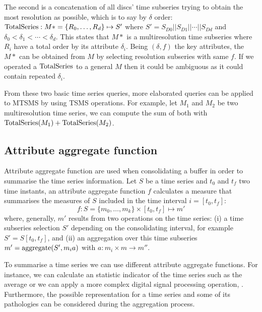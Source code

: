 The second is a concatenation of all discs' time subseries trying to
obtain the most resolution as possible, which is to say by $\delta$
order: $\operatorname{TotalSeries}: M*=\{R_0, \dots, R_d\} \mapsto S'$ where $S' =
S_{D0} || S_{D1} || \cdots || S_{Dd}$ and $\delta_0 < \delta_1 <
\cdots < \delta_d$. This states that $M*$ is a multiresolution time
subseries where $R_i$ have a total order by its attribute
$\delta_i$. Being $(\delta,f)$ the key attributes, the $M*$ can
be obtained from $M$ by selecting resolution subseries with same $f$. If we
operated a $\operatorname{TotalSeries}$ to a general $M$ then it could be ambiguous
as it could contain repeated $\delta_i$.


From these two basic time series queries, more elaborated queries can
be applied to MTSMS by using TSMS operations. For example, let $M_1$
and $M_2$ be two multiresolution time series, we can compute the sum
of both with $\operatorname{TotalSeries}(M_1) + \operatorname{TotalSeries}(M_2)$. 





\subsection{Attribute aggregate function}
\label{sec:model:interpolador}

Attribute aggregate function are used when consolidating a buffer in
order to summarise the time series information. Let $S$ be a time
series and $t_0$ and $t_f$ two time instants, an attribute aggregate
function $f$ calculates a measure that summarises the measures of $S$
included in the time interval $i=[t_0,t_f]$:
\[
f : S=\{m_0,\ldots,m_k\} \times [t_0,t_f] \mapsto m'
\]
where, generally, $m'$ results from two operations on the time series:
(i) a time subseries selection $S'$ depending on the consolidating
interval, for example $S' = S[t_0,t_f]$, and (ii) an aggregation over
this time subseries $m' = \operatorname*{aggregate}(S',m_i a)$ with $a: m_i \times
m\rightarrow m''$.  

To summarise a time series we can use different attribute aggregate
functions.  For instance, we can calculate an statistic indicator of
the time series such as the average or we can apply a more complex
digital signal processing operation, \cite{zhang11}. Furthermore, the
possible representation for a time series and some of its pathologies
can be considered during the aggregation process.


